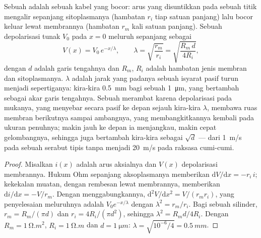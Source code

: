 \begin{theorem}\label{thm:b2:neurons-synapses:cable}
Sebuah  adalah sebuah kabel yang bocor: arus yang disuntikkan pada
sebuah titik mengalir sepanjang sitoplasmanya (hambatan $r_i$ tiap
satuan panjang) lalu bocor keluar lewat membrannya (hambatan $r_m$ kali
satuan panjang). Sebuah depolarisasi tunak $V_0$ pada $x = 0$ meluruh
sepanjang  sebagai
\[
V(x) = V_0\,e^{-x/\lambda}, \qquad \lambda = \sqrt{\frac{r_m}{r_i}} = \sqrt{\frac{R_m\,d}{4R_i}},
\]
dengan $d$ adalah garis tengahnya dan $R_m$, $R_i$ adalah hambatan
jenis membran dan sitoplasmanya. \emph{} $\lambda$
adalah jarak yang padanya sebuah isyarat pasif turun menjadi
sepertiganya: kira-kira \qty{0.5}{mm} bagi sebuah 
\qty{1}{\micro m}, yang bertambah sebagai akar garis tengahnya. Sebuah
 merambat karena depolarisasi pada mukanya, yang menyebar
secara pasif ke depan sejauh kira-kira $\lambda$, membawa ruas membran
berikutnya sampai ambangnya, yang membangkitkannya kembali pada ukuran
penuhnya; makin jauh ke depan ia menjangkau, makin cepat gelombangnya,
sehingga  juga bertambah kira-kira sebagai $\sqrt{d}$ ---
dari \qty{1}{m/s} pada sebuah serabut tipis tanpa  menjadi
\qty{20}{m/s} pada  raksasa cumi-cumi.
\end{theorem}
\begin{proof}
Misalkan $i(x)$ adalah arus aksialnya dan $V(x)$ depolarisasi
membrannya. Hukum Ohm sepanjang aksoplasmanya memberikan $\mathrm{d}V/
\mathrm{d}x = -r_i\,i$; kekekalan muatan, dengan rembesan lewat
membrannya, memberikan $\mathrm{d}i/\mathrm{d}x = -V/r_m$. Dengan
menggabungkannya, $\mathrm{d}^{2}V/\mathrm{d}x^{2} = V/(r_m r_i)$, yang
penyelesaian meluruhnya adalah $V_0 e^{-x/\lambda}$ dengan
$\lambda^{2} = r_m/r_i$. Bagi sebuah silinder, $r_m = R_m/(\pi d)$ dan
$r_i = 4R_i/(\pi d^{2})$, sehingga $\lambda^{2} = R_m d/4R_i$. Dengan
$R_m = \qty{1}{\ohm.m^2}$, $R_i =
\qty{1}{\ohm.m}$ dan $d = \qty{1}{\micro m}$: $\lambda = \sqrt{10^{-6}
/4} = \qty{0.5}{mm}$.
\end{proof}

